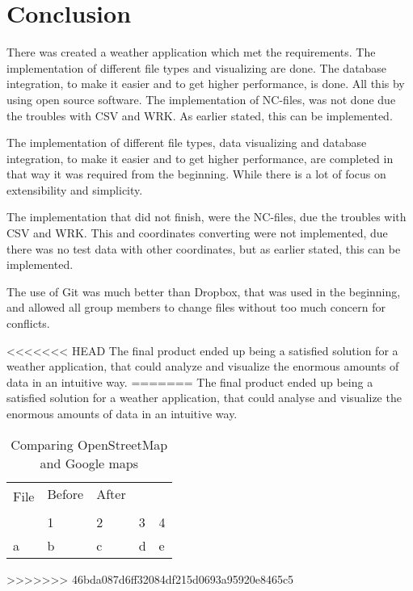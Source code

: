 \chapter{Conclusion}
There was created a weather application which met the requirements.
The implementation of different file types and visualizing are done. The database integration, to make it easier and to get higher performance, is done. All this by using open source software.
The implementation of NC-files, was not done due the troubles with CSV and WRK. As earlier stated, this can be implemented.

The implementation of different file types, data visualizing and database integration, to make it easier and to get higher performance, are completed in that way it was required from the beginning. While there is a lot of focus on extensibility and simplicity.
 
The implementation that did not finish, were the NC-files, due the troubles with CSV and WRK. This and coordinates converting were not implemented, due there was no test data with other coordinates, but as earlier stated, this can be implemented.

The use of Git was much better than Dropbox, that was used in the beginning, and allowed all group members to change files without too much concern for conflicts.

<<<<<<< HEAD
The final product ended up being a satisfied solution for a weather application, that could analyze and visualize the enormous amounts of data in an intuitive way.
=======
The final product ended up being a satisfied solution for a weather application, that could analyse and visualize the enormous amounts of data in an intuitive way.

\begin{table}[htbp]
\centering
\begin{tabular}{| l | l | l | l | l |}
\hline
\multirow{2}{*}{File} & Before & After \\ & & \\ \hline
 & 1 & 2 & 3 & 4 \\ \hline
a & b & c & d & e
\hline
\end{tabular}
\caption{Comparing OpenStreetMap and Google maps}
\label{tab:osm_vs_google}
\end{table}
>>>>>>> 46bda087d6ff32084df215d0693a95920e8465c5

